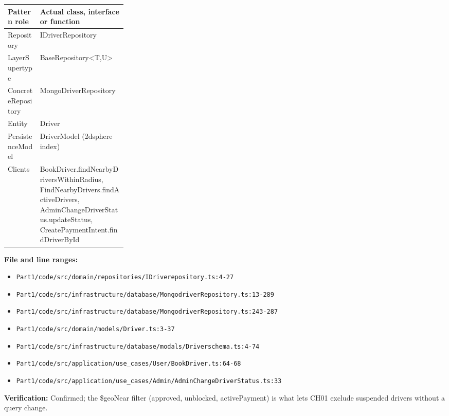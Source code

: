 \documentclass[11pt,a4paper]{article}
\begin{document}
\noindent\begin{tabularx}{\linewidth}{@{}P{0.27\linewidth}Y@{}}
\toprule Pattern role & Actual class, interface or function \\ \midrule
Repository & IDriverRepository \\
LayerSupertype & BaseRepository\textless{}T,U\textgreater{} \\
ConcreteRepository & MongoDriverRepository \\
Entity & Driver \\
PersistenceModel & DriverModel (2dsphere index) \\
Clients & BookDriver.findNearbyDriversWithinRadius, FindNearbyDrivers.findActiveDrivers, AdminChangeDriverStatus.updateStatus, CreatePaymentIntent.findDriverById \\
\bottomrule
\end{tabularx}

\noindent\textbf{File and line ranges:}\begin{itemize}\setlength\itemsep{0pt}\item \texttt{Part1/\allowbreak{}code/\allowbreak{}src/\allowbreak{}domain/\allowbreak{}repositories/\allowbreak{}IDriverepository.\allowbreak{}ts:4-27}\item \texttt{Part1/\allowbreak{}code/\allowbreak{}src/\allowbreak{}infrastructure/\allowbreak{}database/\allowbreak{}MongodriverRepository.\allowbreak{}ts:13-289}\item \texttt{Part1/\allowbreak{}code/\allowbreak{}src/\allowbreak{}infrastructure/\allowbreak{}database/\allowbreak{}MongodriverRepository.\allowbreak{}ts:243-287}\item \texttt{Part1/\allowbreak{}code/\allowbreak{}src/\allowbreak{}domain/\allowbreak{}models/\allowbreak{}Driver.\allowbreak{}ts:3-37}\item \texttt{Part1/\allowbreak{}code/\allowbreak{}src/\allowbreak{}infrastructure/\allowbreak{}database/\allowbreak{}modals/\allowbreak{}Driverschema.\allowbreak{}ts:4-74}\item \texttt{Part1/\allowbreak{}code/\allowbreak{}src/\allowbreak{}application/\allowbreak{}use\_\allowbreak{}cases/\allowbreak{}User/\allowbreak{}BookDriver.\allowbreak{}ts:64-68}\item \texttt{Part1/\allowbreak{}code/\allowbreak{}src/\allowbreak{}application/\allowbreak{}use\_\allowbreak{}cases/\allowbreak{}Admin/\allowbreak{}AdminChangeDriverStatus.\allowbreak{}ts:33}\end{itemize}
\noindent\textbf{Verification:} Confirmed; the \$geoNear filter (approved, unblocked, activePayment) is what lets CH01 exclude suspended drivers without a query change.
\end{document}
